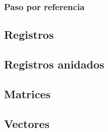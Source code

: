 \documentclass{article}
\begin{document}
\begin{appendices}
  \subsubsection{Paso por referencia}
  



  \subsection{Registros}
  


  \subsection{Registros anidados}
  

  \subsection{Matrices}
  

  \subsection{Vectores}
  

\end{appendices}
\end{document}
